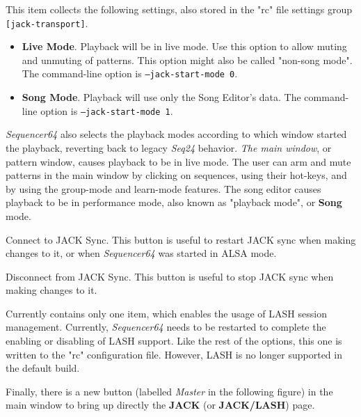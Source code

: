    This item collects the following settings, also stored in the "rc" file
   settings group \texttt{[jack-transport]}.

   \begin{itemize}
      \item \textbf{Live Mode}.
         Playback will be in live mode.  Use this option to allow muting and
         unmuting of patterns.  This option might also be called "non-song
         mode".
         The command-line option is \texttt{--jack-start-mode 0}.
      \item \textbf{Song Mode}.
         Playback will use only the Song Editor's data.
         The command-line option is \texttt{--jack-start-mode 1}.
   \end{itemize}

   \textsl{Sequencer64} also selects the playback modes
   according to which window started the playback,
   reverting back to legacy \textsl{Seq24} behavior.
   \textsl{The main window}, or pattern
   window, causes playback to be in live mode.  The user can arm and mute
   patterns in the main window by clicking on sequences, using their hot-keys,
   and by using the group-mode and learn-mode features.
   The song editor causes playback to be in performance mode, also known as
   "playback mode", or \textbf{Song} mode.

   Connect to JACK Sync.
   This button is useful to restart JACK sync when making changes to it,
   or when \textsl{Sequencer64} was started in ALSA mode.

   Disconnect from JACK Sync.
   This button is useful to stop JACK sync when making changes to it.

   Currently contains only one item, which enables the usage of LASH session
   management.  Currently, \textsl{Sequencer64} needs to be restarted to
   complete the enabling or disabling of LASH support.  Like the rest of the
   options, this one is written to the "rc" configuration file.
   However, LASH is no longer supported in the default build.

   Finally, there is a new button (labelled \textsl{Master} in the following
   figure) in the main window to bring up directly the
   \textbf{JACK} (or \textbf{JACK/LASH}) page.

